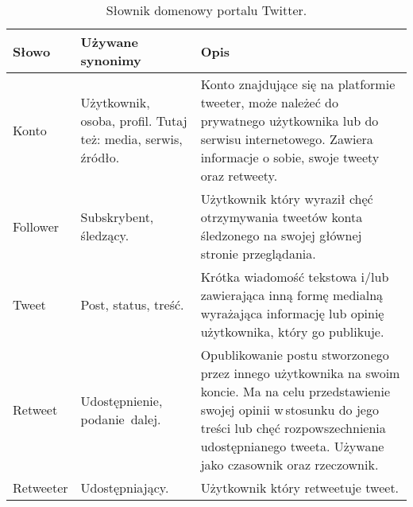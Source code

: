 \begin{table}[!h] \label{tab:slowniktwitter} \centering
\caption{Słownik domenowy portalu Twitter.}
\begin{tabular} { | m{2cm} | m{}| m{7cm} | } \hline
Słowo & Używane synonimy & Opis \\  \hline \hline
Konto & Użytkownik, osoba,
  profil. Tutaj też: media, serwis, źródło. & Konto
  znajdujące się na platformie tweeter, może należeć do prywatnego użytkownika
  lub do serwisu internetowego. Zawiera informacje o sobie, swoje tweety oraz
  retweety. \\ 
\hline
Follower & Subskrybent, śledzący. & Użytkownik który
  wyraził chęć otrzymywania tweetów konta śledzonego na swojej głównej stronie
  przeglądania. \\ 
\hline
Tweet & Post, status,
  treść. & Krótka wiadomość
  tekstowa i/lub zawierająca inną formę medialną wyrażająca informację lub
  opinię użytkownika, który go publikuje. \\ 
\hline
Retweet & Udostępnienie,
  \mbox{podanie dalej.} & Opublikowanie postu
  stworzonego przez innego użytkownika na swoim koncie. Ma na celu przedstawienie
  swojej opinii w\,stosunku do jego treści lub chęć rozpowszechnienia
  udostępnianego tweeta. Używane jako czasownik oraz rzeczownik. \\ 
\hline
Retweeter & Udostępniający. & Użytkownik
  który retweetuje tweet. \\
\hline
\end{tabular}
\end{table}